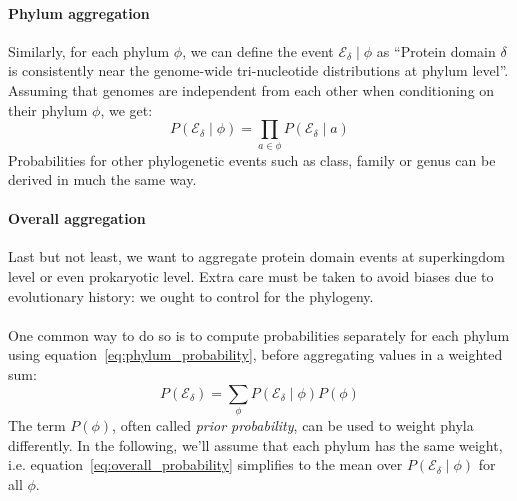 \documentclass[12pt]{article}
\begin{document}
\paragraph{Phylum aggregation}
Similarly, for each phylum $\phi$, we can define the event $\mathscr{E_{\delta}} \mid \phi$ as ``Protein domain $\delta$ is consistently near the genome-wide tri-nucleotide distributions at phylum level''. Assuming that genomes are independent from each other when conditioning on their phylum $\phi$, we get:
%
\begin{equation}
P(\mathscr{E_{\delta}} \mid \phi) = \prod\limits_{a \in \phi} P(\mathscr{E_{\delta}} \mid a)
\label{eq:phylum_probability}
\end{equation}
%
Probabilities for other phylogenetic events such as class, family or genus can be derived in much the same way.

\paragraph{Overall aggregation}
Last but not least, we want to aggregate protein domain events at superkingdom level or even prokaryotic level. Extra care must be taken to avoid biases due to evolutionary history: we ought to control for the phylogeny.\\
\\
One common way to do so is to compute probabilities separately for each phylum using equation~\ref{eq:phylum_probability}, before aggregating values in a weighted sum:
%
\begin{equation}
P(\mathscr{E_{\delta}}) = \sum\limits_{\phi} P(\mathscr{E_{\delta}} \mid \phi)P(\phi)
\label{eq:overall_probability}
\end{equation}
%
The term $P(\phi)$, often called \textit{prior probability}, can be used to weight phyla differently. In the following, we'll assume that each phylum has the same weight, i.e. equation~\ref{eq:overall_probability} simplifies to the mean over $P(\mathscr{E_{\delta}} \mid \phi)$ for all $\phi$.
\end{document}
